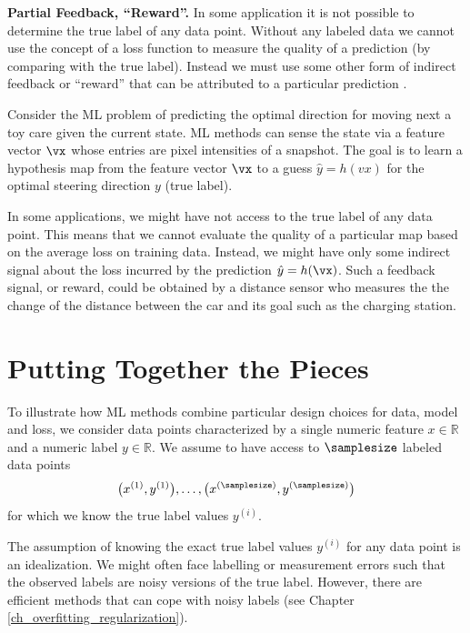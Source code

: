 \documentclass[12pt]{report}
\begin{document}
{\bf Partial Feedback, ``Reward''.}  
In some application it is not possible to determine the true label of 
any data point. Without any labeled data we cannot use the concept 
of a loss function to measure the quality of a prediction (by comparing 
with the true label). Instead we must use some other form of indirect 
feedback or ``reward'' that can be attributed to a particular prediction \cite{PredictionLearningGames,SuttonEd2}. 

Consider the ML problem of predicting the optimal direction for 
moving next a toy care given the current state. ML methods can sense the 
state via a feature vector $\vx$ whose entries are pixel intensities of a 
snapshot. The goal is to learn a hypothesis map from the feature vector 
$\vx$ to a guess $\hat{y} = h(vx)$ for the optimal steering direction $y$ (true label). 

In some applications, we might have not access to the true label of any 
data point. This means that we cannot evaluate the quality of a particular 
map based on the average loss on training data. Instead, we might have 
only some indirect signal about the loss incurred by the prediction 
$\hat{y}=h(\vx)$. Such a feedback signal, or reward, could be obtained 
by a distance sensor who measures the the change of the distance 
between the car and its goal such as the charging station. 

\section{Putting Together the Pieces} 
\label{sec_putting_togehter_the_pieces}

To illustrate how ML methods combine particular design choices for 
data, model and loss, we consider data points characterized by a single 
numeric feature $x \in \mathbb{R}$ and a numeric label $y \in \mathbb{R}$. 
We assume to have access to $\samplesize$ labeled data points 
\begin{equation} 
\big(x^{(1)},y^{(1)}\big),\ldots, \big(x^{(\samplesize)},y^{(\samplesize)}\big)  \label{equ_labeled_data_putting_together}
\end{equation} 
for which we know the true label values $y^{(i)}$. 

The assumption of knowing the exact true label values $y^{(i)}$ 
for any data point is an idealization. We might often face labelling 
or measurement errors such that the observed labels are noisy 
versions of the true label. However, there are efficient methods 
that can cope with noisy labels (see Chapter \ref{ch_overfitting_regularization}). 
\end{document}

